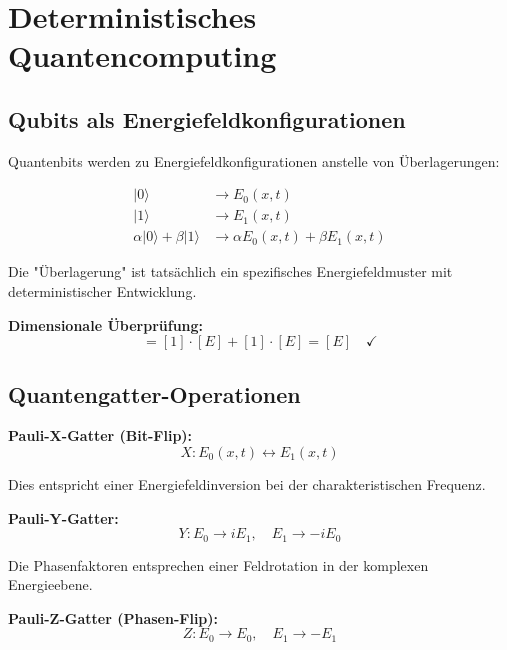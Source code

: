 \documentclass[12pt,a4paper]{report}
\begin{document}
	\section{Deterministisches Quantencomputing}
	\label{sec:deterministic_quantum_computing}
	
	\subsection{Qubits als Energiefeldkonfigurationen}
	\label{subsec:qubits_energy_fields}
	
	Quantenbits werden zu Energiefeldkonfigurationen anstelle von Überlagerungen:
	
	\begin{align}
		|0\rangle &\rightarrow E_0(x,t) \\
		|1\rangle &\rightarrow E_1(x,t) \\
		\alpha|0\rangle + \beta|1\rangle &\rightarrow \alpha E_0(x,t) + \beta E_1(x,t)
	\end{align}
	
	Die "Überlagerung" ist tatsächlich ein spezifisches Energiefeldmuster mit deterministischer Entwicklung.
	
	\textbf{Dimensionale Überprüfung:}
	\begin{equation}
		[\alpha E_0 + \beta E_1] = [1] \cdot [E] + [1] \cdot [E] = [E] \quad \checkmark
	\end{equation}
	
	\subsection{Quantengatter-Operationen}
	\label{subsec:quantum_gate_operations}
	
	\textbf{Pauli-X-Gatter (Bit-Flip):}
	\begin{equation}
		X: E_0(x,t) \leftrightarrow E_1(x,t)
	\end{equation}
	
	Dies entspricht einer Energiefeldinversion bei der charakteristischen Frequenz.
	
	\textbf{Pauli-Y-Gatter:}
	\begin{equation}
		Y: E_0 \rightarrow iE_1, \quad E_1 \rightarrow -iE_0
	\end{equation}
	
	Die Phasenfaktoren entsprechen einer Feldrotation in der komplexen Energieebene.
	
	\textbf{Pauli-Z-Gatter (Phasen-Flip):}
	\begin{equation}
		Z: E_0 \rightarrow E_0, \quad E_1 \rightarrow -E_1
	\end{equation}
	
\end{document}

